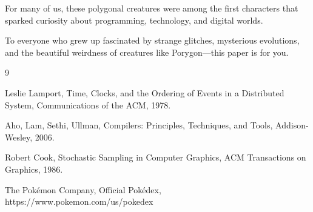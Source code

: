 \documentclass[conference]{IEEEtran}
\begin{document}
For many of us, these polygonal creatures were among the first characters that sparked curiosity about programming, technology, and digital worlds.

To everyone who grew up fascinated by strange glitches, mysterious evolutions, and the beautiful weirdness of creatures like Porygon—this paper is for you.

\begin{thebibliography}{9}

Leslie Lamport,
Time, Clocks, and the Ordering of Events in a Distributed System,
Communications of the ACM, 1978.

Aho, Lam, Sethi, Ullman,
Compilers: Principles, Techniques, and Tools,
Addison-Wesley, 2006.

Robert Cook,
Stochastic Sampling in Computer Graphics,
ACM Transactions on Graphics, 1986.

The Pokémon Company,
Official Pokédex,
https://www.pokemon.com/us/pokedex

\end{thebibliography}
\end{document}
